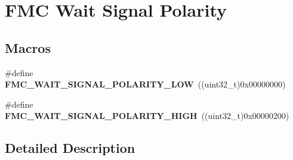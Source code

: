 \hypertarget{group___f_m_c___wait___signal___polarity}{}\section{F\+MC Wait Signal Polarity}
\label{group___f_m_c___wait___signal___polarity}
\subsection*{Macros}
\begin{DoxyCompactItemize}
\item 
\#define {\bfseries F\+M\+C\+\_\+\+W\+A\+I\+T\+\_\+\+S\+I\+G\+N\+A\+L\+\_\+\+P\+O\+L\+A\+R\+I\+T\+Y\+\_\+\+L\+OW}~((uint32\+\_\+t)0x00000000)\hypertarget{group___f_m_c___wait___signal___polarity_gac34b12eb54afdd02abeb853c09dfd6b2}{}\label{group___f_m_c___wait___signal___polarity_gac34b12eb54afdd02abeb853c09dfd6b2}

\item 
\#define {\bfseries F\+M\+C\+\_\+\+W\+A\+I\+T\+\_\+\+S\+I\+G\+N\+A\+L\+\_\+\+P\+O\+L\+A\+R\+I\+T\+Y\+\_\+\+H\+I\+GH}~((uint32\+\_\+t)0x00000200)\hypertarget{group___f_m_c___wait___signal___polarity_gaca059707d16adc2986cf4716daf45d6a}{}\label{group___f_m_c___wait___signal___polarity_gaca059707d16adc2986cf4716daf45d6a}

\end{DoxyCompactItemize}


\subsection{Detailed Description}
